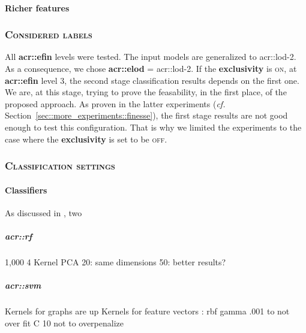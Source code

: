             \paragraph{Richer features}

        \subsubsection{\textsc{Considered labels}}
            All \textbf{\gls{acr::efin}} levels were tested.
            The input models are generalized to \gls{acr::lod}-2.
            As a consequence, we chose \textbf{\gls{acr::elod}} = \gls{acr::lod}-2.
            If the \textbf{exclusivity} is \textsc{on}, at \textbf{\gls{acr::efin}} level 3, the second stage classification results depends on the first one.
            We are, at this stage, trying to prove the feasability, in the first place, of the proposed approach.
            As proven in the latter experiments (\textit{cf.} Section~\ref{sec::more_experiments::finesse}), the first stage results are not good enough to test this configuration.
            That is why we limited the experiments to the case where the \textbf{exclusivity} is set to be \textsc{off}.

        \subsubsection{\textsc{Classification settings}}

            \paragraph{Classifiers}
                As discussed in , two 
                \subparagraph{\acrshort*{acr::rf}}
                    1,000
                    4
                    Kernel PCA
                    20: same dimensions
                    50: better results?

                \subparagraph{\acrshort*{acr::svm}}
                    Kernels for graphs are up
                    Kernels for feature vectors : rbf gamma .001 to not over fit
                    C 10 not to overpenalize

